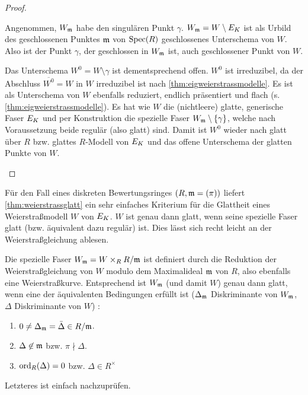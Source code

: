 \documentclass[german]{scrreprt}
\begin{document}
\begin{Lemma}
\begin{proof}
\begin{enumerate}[label=(\alph*)]
      Angenommen, $W_{\mathfrak{m}}$ habe den singulären Punkt $\gamma$.
      $W_{\mathfrak{m}}=W\setminus E_{K}$ ist als Urbild des geschlossenen Punktes
      $\mathfrak{m}$ von $\operatorname{Spec}(R)$ geschlossenes Unterschema von $W$.
      Also ist der Punkt $\gamma$, der geschlossen in $W_{\mathfrak{m}}$ ist, auch
      geschlossener Punkt von $W$.
      
      Das Unterschema $W^0=W\setminus\gamma$ ist dementsprechend offen.
      $W^0$ ist irreduzibel, da der Abschluss $\overline{W^0}=W$ in
      $W$ irreduzibel ist nach \ref{thm:eigweierstrassmodelle}.
      Es ist als Unterschema von $W$ ebenfalls reduziert, endlich
      präsentiert und flach (s. \ref{thm:eigweierstrassmodelle}).
      Es hat wie $W$ die (nichtleere) glatte, generische Faser $E_{K}$ und
      per Konstruktion die spezielle Faser $W_{\mathfrak{m}}\setminus\{\gamma\}$,
      welche nach Voraussetzung beide regulär (also glatt) sind.
      Damit ist $W^0$ wieder nach \cite[8.5, Proposition 17]{bosch}
      glatt über $R$ bzw. glattes $R$-Modell von $E_{K}$ und das offene
      Unterschema der glatten Punkte von $W$.
    \end{enumerate}
  \end{proof}
\end{Lemma}

\begin{Bemerkung}\label{thm:weierstraßmodellglatt}
  Für den Fall eines diskreten Bewertungsringes $(R,\mathfrak{m}=(\pi))$ liefert
  \ref{thm:weierstrassglatt} ein sehr einfaches Kriterium für die
  Glattheit eines Weierstraßmodell $W$ von $E_{K}$.
  $W$ ist genau dann glatt, wenn seine spezielle Faser glatt
  (bzw. äquivalent dazu regulär) ist.
  Dies lässt sich recht leicht an der Weierstraßgleichung ablesen.
  
  Die spezielle Faser $W_{\mathfrak{m}}=W\times_R R/\mathfrak{m}$ ist definiert
  durch die Reduktion der Weierstraßgleichung von $W$ modulo dem
  Maximalideal $\mathfrak{m}$ von $R$, also ebenfalls eine Weierstraßkurve.
  Entsprechend ist $W_{\mathfrak{m}}$ (und damit $W$) genau dann glatt, wenn
  eine der äquivalenten Bedingungen erfüllt ist
  ($\Delta_{\mathfrak{m}}$ Diskriminante von $W_{\mathfrak{m}}$,
  $\Delta$ Diskriminante von $W$)
  \cite[Proposition VII.5.1 (a)]{silverman}:
  \begin{enumerate}[label=(\roman*)]
  \item $0\neq\Delta_{\mathfrak{m}}=\bar\Delta\in R/\mathfrak{m}$.
  \item $\Delta\not\in\mathfrak{m}$ bzw. $\pi\nmid\Delta$.
  \item $\operatorname{ord}_R(\Delta)=0$ bzw. $\Delta\in R^\times$
  \end{enumerate}
  Letzteres ist einfach nachzuprüfen.
\end{Bemerkung}
\end{document}
